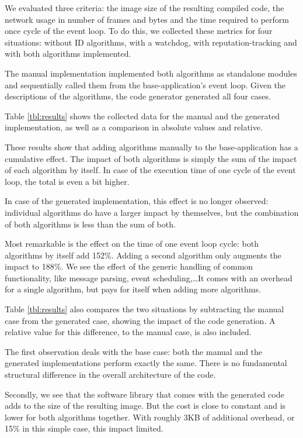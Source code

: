 \documentclass[conference]{IEEEtran}
\begin{document}
We evaluated three criteria: the image size of the resulting compiled code, the
network usage in number of frames and bytes and the time required to perform
once cycle of the event loop. To do this, we collected these metrics for four
situations: without ID algorithms, with a watchdog, with reputation-tracking
and with both algorithms implemented.

The manual implementation implemented both algorithms as standalone modules and
sequentially called them from the base-application's event loop. Given the
\NAME descriptions of the algorithms, the code generator generated all four
cases.

Table \ref{tbl:results} shows the collected data for the manual and the
generated implementation, as well as a comparison in absolute values and
relative.

These results show that adding algorithms manually to the base-application has
a cumulative effect. The impact of both algorithms is simply the sum of the
impact of each algorithm by itself. In case of the execution time of one cycle
of the event loop, the total is even a bit higher.

In case of the generated implementation, this effect is no longer observed:
individual algorithms do have a larger impact by themselves, but the
combination of both algorithms is less than the sum of both.

Most remarkable is the effect on the time of one event loop cycle: both
algorithms by itself add 152\%. Adding a second algorithm only augments the
impact to 188\%. We see the effect of the generic handling of common
functionality, like message parsing, event scheduling,\dots It comes with an
overhead for a single algorithm, but pays for itself when adding more
algorithms.

Table \ref{tbl:results} also compares the two situations by subtracting the
manual case from the generated case, showing the impact of the code generation.
A relative value for this difference, to the manual case, is also included.

The first observation deals with the base case: both the manual and the
generated implementations perform exactly the same. There is no fundamental
structural difference in the overall architecture of the code.

Secondly, we see that the software library that comes with the generated code
adds to the size of the resulting image. But the cost is close to constant and
is lower for both algorithms together. With roughly 3KB of additional overhead,
or 15\% in this simple case, this impact limited.
\end{document}
